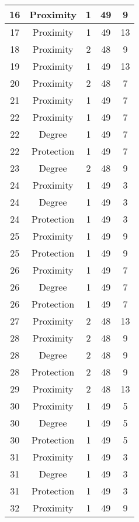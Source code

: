 \documentclass[results.tex]{subfiles}
\begin{document}
\begin{center}
\begin{tabular}{| c || c | c | c | c |}
    \hline
    16 & Proximity & 1 & 49 & 9 \\ 
    \hline
    17 & Proximity & 1 & 49 & 13 \\ 
    \hline
    18 & Proximity & 2 & 48 & 9 \\ 
    \hline
    19 & Proximity & 1 & 49 & 13 \\ 
    \hline
    20 & Proximity & 2 & 48 & 7 \\ 
    \hline
    21 & Proximity & 1 & 49 & 7 \\ 
    \hline
    22 & Proximity & 1 & 49 & 7 \\ 
    \hline
    22 & Degree & 1 & 49 & 7 \\ 
    \hline
    22 & Protection & 1 & 49 & 7 \\ 
    \hline
    23 & Degree & 2 & 48 & 9 \\ 
    \hline
    24 & Proximity & 1 & 49 & 3 \\ 
    \hline
    24 & Degree & 1 & 49 & 3 \\ 
    \hline
    24 & Protection & 1 & 49 & 3 \\ 
    \hline
    25 & Proximity & 1 & 49 & 9 \\ 
    \hline
    25 & Protection & 1 & 49 & 9 \\ 
    \hline
    26 & Proximity & 1 & 49 & 7 \\ 
    \hline
    26 & Degree & 1 & 49 & 7 \\ 
    \hline
    26 & Protection & 1 & 49 & 7 \\ 
    \hline
    27 & Proximity & 2 & 48 & 13 \\ 
    \hline
    28 & Proximity & 2 & 48 & 9 \\ 
    \hline
    28 & Degree & 2 & 48 & 9 \\ 
    \hline
    28 & Protection & 2 & 48 & 9 \\ 
    \hline
    29 & Proximity & 2 & 48 & 13 \\ 
    \hline
    30 & Proximity & 1 & 49 & 5 \\ 
    \hline
    30 & Degree & 1 & 49 & 5 \\ 
    \hline
    30 & Protection & 1 & 49 & 5 \\ 
    \hline
    31 & Proximity & 1 & 49 & 3 \\ 
    \hline
    31 & Degree & 1 & 49 & 3 \\ 
    \hline
    31 & Protection & 1 & 49 & 3 \\ 
    \hline
    32 & Proximity & 1 & 49 & 9 \\ 

\end{tabular}
\end{center}
\end{document}
